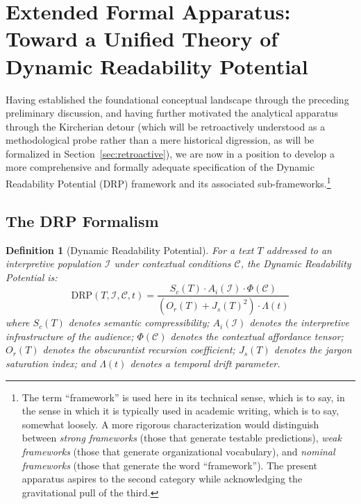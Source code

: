 \documentclass[12pt, a4paper]{article}
\newtheorem{definition}{Definition}
\begin{document}
\section{Extended Formal Apparatus: Toward a Unified Theory of Dynamic Readability Potential}


Having established the foundational conceptual landscape through the preceding preliminary discussion, and having further motivated the analytical apparatus through the Kircherian detour (which will be retroactively understood as a methodological probe rather than a mere historical digression, as will be formalized in Section~\ref{sec:retroactive}), we are now in a position to develop a more comprehensive and formally adequate specification of the Dynamic Readability Potential (DRP) framework and its associated sub-frameworks.\footnote{The term ``framework'' is used here in its technical sense, which is to say, in the sense in which it is typically used in academic writing, which is to say, somewhat loosely. A more rigorous characterization would distinguish between \textit{strong frameworks} (those that generate testable predictions), \textit{weak frameworks} (those that generate organizational vocabulary), and \textit{nominal frameworks} (those that generate the word ``framework''). The present apparatus aspires to the second category while acknowledging the gravitational pull of the third.}

\subsection{The DRP Formalism}

\begin{definition}[Dynamic Readability Potential]
\label{def:drp}
For a text $T$ addressed to an interpretive population $\mathcal{I}$ under contextual conditions $\mathcal{C}$, the Dynamic Readability Potential is:
\[
\mathrm{DRP}(T, \mathcal{I}, \mathcal{C}, t) = \frac{S_c(T) \cdot A_i(\mathcal{I}) \cdot \Phi(\mathcal{C})}{\left(O_r(T) + J_s(T)^2\right) \cdot \Lambda(t)}
\]
where $S_c(T)$ denotes semantic compressibility; $A_i(\mathcal{I})$ denotes the interpretive infrastructure of the audience; $\Phi(\mathcal{C})$ denotes the contextual affordance tensor; $O_r(T)$ denotes the obscurantist recursion coefficient; $J_s(T)$ denotes the jargon saturation index; and $\Lambda(t)$ denotes a temporal drift parameter.
\end{definition}
\end{document}
